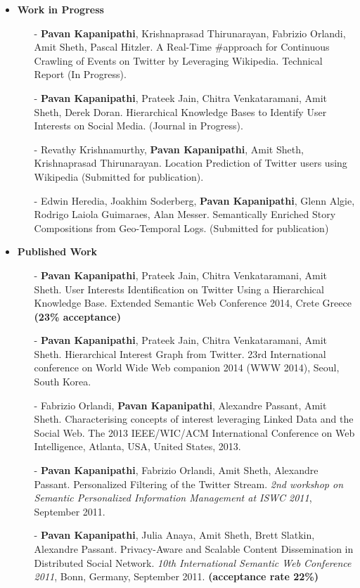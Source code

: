 \documentclass[letterpaper,11pt]{article}
\begin{document}
\begin{itemize}
\item \textbf{Work in Progress}
\begin{itemize}
\item[-] \textbf{Pavan Kapanipathi}, Krishnaprasad Thirunarayan, Fabrizio Orlandi, Amit Sheth, Pascal Hitzler. A Real-Time \#approach for Continuous Crawling of Events on Twitter by Leveraging Wikipedia. Technical Report (In Progress).
\item[-] \textbf{Pavan Kapanipathi}, Prateek Jain, Chitra Venkataramani, Amit Sheth, Derek Doran. Hierarchical Knowledge Bases to Identify User Interests on Social Media. (Journal in Progress).
\item[-] Revathy Krishnamurthy, \textbf{Pavan Kapanipathi}, Amit Sheth, Krishnaprasad Thirunarayan. Location Prediction of Twitter users using Wikipedia (Submitted for publication).
\item[-] Edwin Heredia, Joakhim Soderberg, \textbf{Pavan Kapanipathi}, Glenn Algie, Rodrigo Laiola Guimaraes, Alan Messer. Semantically Enriched Story Compositions from Geo-Temporal Logs. (Submitted for publication)
\end{itemize}
\item\textbf{Published Work}
\begin{itemize}
\item[-] \textbf{Pavan Kapanipathi}, Prateek Jain, Chitra Venkataramani, Amit Sheth. User Interests Identification on Twitter Using a Hierarchical Knowledge Base. Extended Semantic Web Conference 2014, Crete Greece \textbf{(23\% acceptance)}
\item[-] \textbf{Pavan Kapanipathi}, Prateek Jain, Chitra Venkataramani, Amit Sheth. Hierarchical Interest Graph from Twitter.  23rd International conference on World Wide Web companion 2014 (WWW 2014), Seoul, South Korea. 
\item[-] Fabrizio Orlandi, \textbf{Pavan Kapanipathi}, Alexandre Passant, Amit Sheth. Characterising concepts of interest leveraging Linked Data and the Social Web. The 2013 IEEE/WIC/ACM International Conference on Web Intelligence, Atlanta, USA, United States, 2013.
\item[-] \textbf{Pavan Kapanipathi}, Fabrizio Orlandi, Amit Sheth, Alexandre Passant. Personalized Filtering of the Twitter Stream. \textit{2nd workshop on Semantic Personalized Information Management at ISWC 2011}, September 2011. 
\item[-] \textbf{Pavan Kapanipathi}, Julia Anaya, Amit Sheth, Brett Slatkin, Alexandre Passant. Privacy-Aware and Scalable Content Dissemination in Distributed Social Network. \textit{10th International Semantic Web Conference 2011}, Bonn, Germany,  September 2011. \textbf{(acceptance rate 22\%)}

\end{itemize}
\end{itemize}
\end{document}
